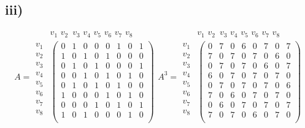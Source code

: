 \documentclass[a4paper,12pt,titlepage]{article}
\begin{document}
\subsection*{iii)}
\begin{equation*} 
A=\begin{array}{c}
\\
v_1\\
v_2\\
v_3\\
v_4\\
v_5\\
v_6\\
v_7\\
v_8
\end{array} 
\begin{array}{c}   
    v_1\,\, v_2 \,\,\, v_3 \,\, v_4 \,\, v_5 \,\, v_6\,\, v_7\,\, v_8 \\
  \left(                 
  \begin{array}{cccccccc}   
    0 & 1 & 0 & 0 & 0 & 1 & 0 & 1 \\  
    1 & 0 & 1 & 0 & 1 & 0 & 0 & 0 \\
    0 & 1 & 0 & 1 & 0 & 0 & 0 & 1 \\
    0 & 0 & 1 & 0 & 1 & 0 & 1 & 0 \\
    0 & 1 & 0 & 1 & 0 & 1 & 0 & 0 \\
    1 & 0 & 0 & 0 & 1 & 0 & 1 & 0 \\
    0 & 0 & 0 & 1 & 0 & 1 & 0 & 1 \\
    1 & 0 & 1 & 0 & 0 & 0 & 1 & 0 \\
  \end{array}
\right)  
\end{array}    
A^3=\begin{array}{c}
\\
v_1\\
v_2\\
v_3\\
v_4\\
v_5\\
v_6\\
v_7\\
v_8
\end{array} 
\begin{array}{c}   
    v_1\,\, v_2 \,\,\, v_3 \,\, v_4 \,\, v_5 \,\, v_6\,\, v_7\,\, v_8 \\
  \left(                 
  \begin{array}{cccccccc}   
    0 & 7 & 0 & 6 & 0 & 7 & 0 & 7 \\  
    7 & 0 & 7 & 0 & 7 & 0 & 6 & 0 \\
    0 & 7 & 0 & 7 & 0 & 6 & 0 & 7 \\
    6 & 0 & 7 & 0 & 7 & 0 & 7 & 0 \\
    0 & 7 & 0 & 7 & 0 & 7 & 0 & 6 \\
    7 & 0 & 6 & 0 & 7 & 0 & 7 & 0 \\
    0 & 6 & 0 & 7 & 0 & 7 & 0 & 7 \\
    7 & 0 & 7 & 0 & 6 & 0 & 7 & 0 \\
  \end{array}
\right)  
\end{array}   
\end{equation*}
\end{document}
